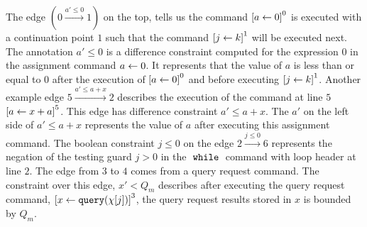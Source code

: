 The edge $(0 \xrightarrow{a' \leq 0} 1)$ on the top, tells us the command 
$\clabel{\assign{a}{0}}^0$ is executed with a continuation point $1$ such that the
command $\clabel{\assign{j}{k}}^1$ will be executed next.
The annotation $a' \leq 0$ is a difference constraint 
computed for
the expression $0$ in the assignment command $\mathrel{ a \leftarrow 0 }$.
It represents that the value of $a$ is less than or equal to $0$ after the
execution of $\clabel{\assign{a}{0}}^0$ and before executing $\clabel{\assign{j}{k}}^1$.
Another example edge $5 \xrightarrow{a' \leq a + x } 2$ describes the execution of
 the command at line $5$
$\clabel{\assign{a}{x + a}}^{5}$.
This edge has difference constraint $a' \leq a+x $.
The $a'$ on the left side of $a' \leq a+x$ represents the value of $a$ after executing this assignment command.
The boolean constraint $j \leq 0 $ on the edge $2 \xrightarrow{j \leq 0} 6$
represents the negation of the testing guard $j > 0$
in the $\;\mathtt{while}\;$ command with loop header at line $2$.
The edge from $3$ to $4$ comes from a query request command.
The constraint over this edge, $x' < Q_m$ describes after executing the query request command,
$\clabel{\assign{x}{\query(\chi[j])} }^{3}$, the query request results stored in $x$ is bounded by $Q_m$. 


